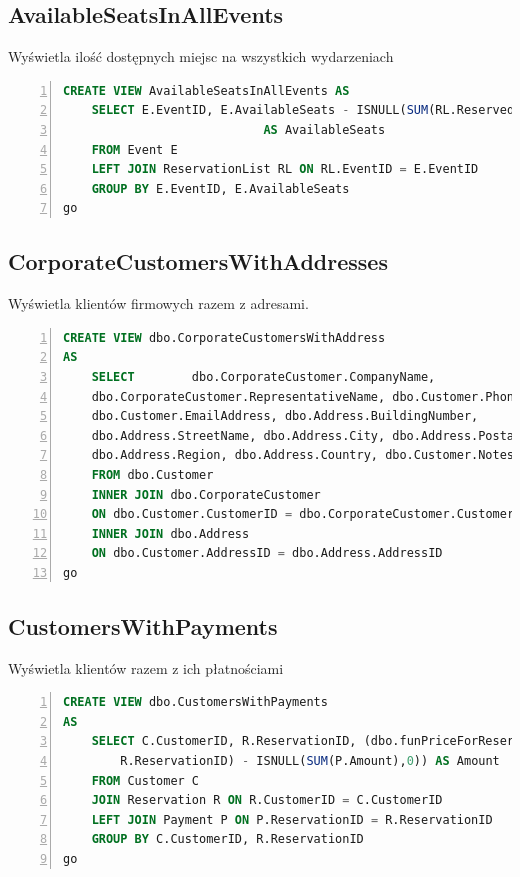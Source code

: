 \documentclass[]{article}
\begin{document}
	\subsection{AvailableSeatsInAllEvents}
	Wyświetla ilość dostępnych miejsc na wszystkich wydarzeniach
	\begin{lstlisting}[language=SQL,
						showspaces=false,
						basicstyle=\ttfamily,
						numbers=left,
						numberstyle=\tiny,
						backgroundcolor=\color{lightg},
						keywordstyle=\color{lightblue},
						commentstyle=\color{gray}]
CREATE VIEW AvailableSeatsInAllEvents AS
	SELECT E.EventID, E.AvailableSeats - ISNULL(SUM(RL.ReservedSeats), 0)
							AS AvailableSeats
	FROM Event E
	LEFT JOIN ReservationList RL ON RL.EventID = E.EventID
	GROUP BY E.EventID, E.AvailableSeats
go
	\end{lstlisting}

	\subsection{CorporateCustomersWithAddresses}
	Wyświetla klientów firmowych razem z adresami.
	\begin{lstlisting}[language=SQL,
						showspaces=false,
						basicstyle=\ttfamily,
						numbers=left,
						numberstyle=\tiny,
						backgroundcolor=\color{lightg},
						keywordstyle=\color{lightblue},
						commentstyle=\color{gray}]
CREATE VIEW dbo.CorporateCustomersWithAddress
AS
	SELECT        dbo.CorporateCustomer.CompanyName,
	dbo.CorporateCustomer.RepresentativeName, dbo.Customer.PhoneNumber,
	dbo.Customer.EmailAddress, dbo.Address.BuildingNumber,
	dbo.Address.StreetName, dbo.Address.City, dbo.Address.PostalCode,
	dbo.Address.Region, dbo.Address.Country, dbo.Customer.Notes
	FROM dbo.Customer
	INNER JOIN dbo.CorporateCustomer
	ON dbo.Customer.CustomerID = dbo.CorporateCustomer.CustomerID
	INNER JOIN dbo.Address
	ON dbo.Customer.AddressID = dbo.Address.AddressID
go
	\end{lstlisting}

	\subsection{CustomersWithPayments}
	Wyświetla klientów razem z ich płatnościami
	\begin{lstlisting}[language=SQL,
						showspaces=false,
						basicstyle=\ttfamily,
						numbers=left,
						numberstyle=\tiny,
						backgroundcolor=\color{lightg},
						keywordstyle=\color{lightblue},
						commentstyle=\color{gray}]
CREATE VIEW dbo.CustomersWithPayments
AS
	SELECT C.CustomerID, R.ReservationID, (dbo.funPriceForReservation(
		R.ReservationID) - ISNULL(SUM(P.Amount),0)) AS Amount
	FROM Customer C
	JOIN Reservation R ON R.CustomerID = C.CustomerID
	LEFT JOIN Payment P ON P.ReservationID = R.ReservationID
	GROUP BY C.CustomerID, R.ReservationID
go
	\end{lstlisting}
	
\end{document}
